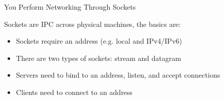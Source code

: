   \begin{frame}{You Perform Networking Through Sockets}

    Sockets are IPC across physical machines, the basics are:

      \begin{itemize}
        \item Sockets require an address (e.g. local and IPv4/IPv6)
        \item There are two types of sockets: stream and datagram
        \item Servers need to bind to an address, listen, and accept connections
        \item Clients need to connect to an address
      \end{itemize}
  \end{frame}

